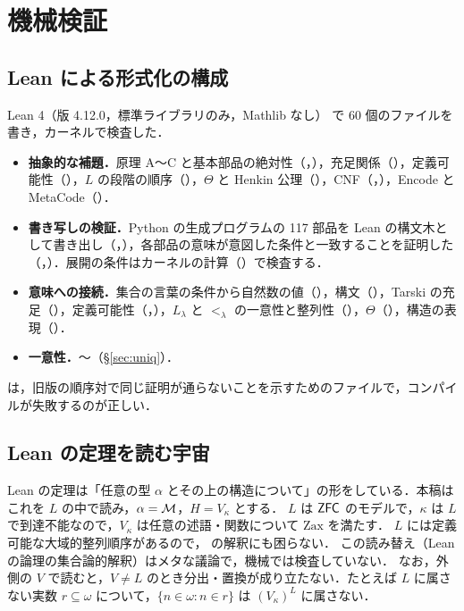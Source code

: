 \section{機械検証}\label{sec:verify}

\subsection{Lean による形式化の構成}
Lean 4（版 4.12.0，標準ライブラリのみ，Mathlib なし）\cite{lean} で 60 個のファイルを書き，カーネルで検査した．
\begin{itemize}
\item \textbf{抽象的な補題．}原理 A〜C と基本部品の絶対性（，），充足関係（），定義可能性（），$L$ の段階の順序（），$\Theta$ と Henkin 公理（），CNF（，），Encode と MetaCode（）．
\item \textbf{書き写しの検証．}Python の生成プログラムの 117 部品を Lean の構文木として書き出し（，），各部品の意味が意図した条件と一致することを証明した（，）．展開の条件はカーネルの計算（）で検査する．
\item \textbf{意味への接続．}集合の言葉の条件から自然数の値（），構文（），Tarski の充足（），定義可能性（，），$L_\lambda$ と $<_\lambda$ の一意性と整列性（），$\Theta$（），構造の表現（）．
\item \textbf{一意性．}〜（\S\ref{sec:uniq}）．
\end{itemize}
 は，旧版の順序対で同じ証明が通らないことを示すためのファイルで，コンパイルが失敗するのが正しい．

\subsection{Lean の定理を読む宇宙}\label{sec:readL}
Lean の定理は「任意の型 $\alpha$ とその上の構造について」の形をしている．本稿はこれを $L$ の中で読み，$\alpha=\mathcal{M}$，$H=V_\kappa$ とする．
$L$ は $\mathsf{ZFC}$ のモデルで，$\kappa$ は $L$ で到達不能なので，$V_\kappa$ は任意の述語・関数について $\mathrm{Zax}$ を満たす．
$L$ には定義可能な大域的整列順序があるので， の解釈にも困らない．
この読み替え（Lean の論理の集合論的解釈）はメタな議論で，機械では検査していない．
なお，外側の $V$ で読むと，$V\neq L$ のとき分出・置換が成り立たない．たとえば $L$ に属さない実数 $r\subseteq\omega$ について，$\{n\in\omega:n\in r\}$ は $(V_\kappa)^L$ に属さない．

